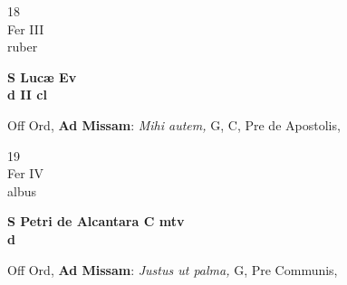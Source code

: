 \documentclass[10pt, openany]{book}
\begin{document}
        \begin{center}
            \begin{minipage}{3.5in}
                \vspace{2em}
                \begin{minipage}{0.5in}
                    {\Huge 18} \\
                    {\normalsize Fer III} \\
                    {\normalsize ruber}
                \end{minipage}
                \begin{minipage}{3.0in}
                    \textbf{ \large S Lucæ Ev \\
                    \textnormal{\normalsize d II cl}} \\ 
                \end{minipage}
                \begin{justify}Off Ord, \textbf{Ad Missam}: \textit{Mihi autem,} G, C, Pre de Apostolis,   
                \end{justify}
            \end{minipage}
        \end{center}
    
        \begin{center}
            \begin{minipage}{3.5in}
                \vspace{2em}
                \begin{minipage}{0.5in}
                    {\Huge 19} \\
                    {\normalsize Fer IV} \\
                    {\normalsize albus}
                \end{minipage}
                \begin{minipage}{3.0in}
                    \textbf{ \large S Petri de Alcantara C mtv \\
                    \textnormal{\normalsize d}} \\ 
                \end{minipage}
                \begin{justify}Off Ord, \textbf{Ad Missam}: \textit{Justus ut palma,} G, Pre Communis,   
                \end{justify}
            \end{minipage}
        \end{center}
    
\end{document}
